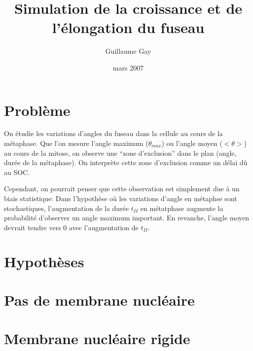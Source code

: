 \documentclass[12pt]{article}
\newcommand{\Tmoy}{<\theta>}
\begin{document}
\title{Simulation de la croissance et de l'élongation du fuseau}

\author{Guillaume Gay}
\date{mars 2007}


\section{Problème}

On étudie les variations d'angles du fuseau dans la cellule au cours
de la métaphase.  Que l'on mesure l'angle maximum ($\theta_{max}$) ou
l'angle moyen ($\Tmoy$) au cours de la mitose, on observe une ``zone
d'exclusion'' dans le plan (angle, durée de la métaphase). On
interprète cette zone d'exclusion comme un délai dû au SOC.

Cependant, on pourrait penser que cette observation est simplement due
à un biais statistique:
Dans l'hypothèse où les variations d'angle en métaphse sont
stochastiques, l'augmentation de la durée $t_{II}$  en métatphase augmente
la probabilité d'observer un angle maximum important. En revanche,
l'angle moyen devrait tendre vers 0 avec l'augmentation de $t_{II}$.


\section{Hypothèses}

\section{Pas de membrane nucléaire}

\section{Membrane nucléaire rigide}
\end{document}
